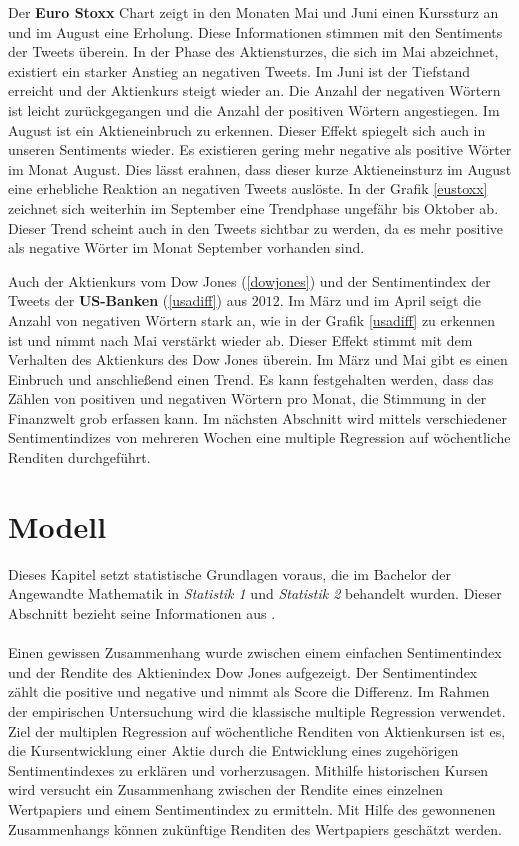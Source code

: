 Der \textbf{Euro Stoxx} Chart zeigt in den Monaten Mai und Juni einen Kurssturz an und im August eine Erholung. Diese Informationen stimmen mit den Sentiments der Tweets überein. In der Phase des Aktiensturzes, die sich im Mai abzeichnet, existiert ein starker Anstieg an negativen Tweets. Im Juni ist der Tiefstand erreicht und der Aktienkurs steigt wieder an. Die Anzahl der negativen Wörtern ist leicht zurückgegangen und die Anzahl der positiven Wörtern angestiegen. Im August ist ein Aktieneinbruch zu erkennen. Dieser Effekt spiegelt sich auch in unseren Sentiments wieder. Es existieren gering mehr negative als positive Wörter im Monat August. Dies lässt erahnen, dass dieser kurze Aktieneinsturz im August eine erhebliche Reaktion an negativen Tweets auslöste. In der Grafik \ref{eustoxx} zeichnet sich weiterhin im September eine Trendphase ungefähr bis Oktober ab. Dieser Trend scheint auch in den Tweets sichtbar zu werden, da es mehr positive als negative Wörter im Monat September vorhanden sind. 

Auch der Aktienkurs vom Dow Jones (\ref{dowjones}) und der Sentimentindex der Tweets der \textbf{US-Banken} (\ref{usadiff}) aus $2012$. Im März und im April seigt die Anzahl von negativen Wörtern stark an, wie in der Grafik \ref{usadiff} zu erkennen ist und nimmt nach Mai verstärkt wieder ab. Dieser Effekt stimmt mit dem Verhalten des Aktienkurs des Dow Jones überein. Im März und Mai gibt es einen Einbruch und anschließend einen Trend. Es kann festgehalten werden, dass das Zählen von positiven und negativen Wörtern pro Monat, die Stimmung in der Finanzwelt grob erfassen kann. Im nächsten Abschnitt wird mittels verschiedener Sentimentindizes von mehreren Wochen eine multiple Regression auf wöchentliche Renditen durchgeführt.

\section{Modell}\label{Modell}
Dieses Kapitel setzt statistische Grundlagen voraus, die im Bachelor der Angewandte Mathematik in \textit{Statistik 1} und \textit{Statistik 2} behandelt wurden. Dieser Abschnitt bezieht seine Informationen aus \cite{becker}. \\
\\
Einen gewissen Zusammenhang wurde zwischen einem einfachen Sentimentindex und der Rendite des Aktienindex  Dow Jones aufgezeigt. Der Sentimentindex zählt die positive und negative und nimmt als Score die Differenz. Im Rahmen der empirischen Untersuchung wird die klassische multiple Regression verwendet. Ziel der multiplen Regression auf wöchentliche Renditen von Aktienkursen ist es, die Kursentwicklung einer Aktie durch die Entwicklung eines zugehörigen Sentimentindexes zu erklären und vorherzusagen. Mithilfe historischen Kursen wird versucht ein Zusammenhang zwischen der Rendite eines einzelnen Wertpapiers und einem Sentimentindex zu ermitteln. Mit Hilfe des gewonnenen Zusammenhangs können zukünftige Renditen des Wertpapiers geschätzt werden. \\

